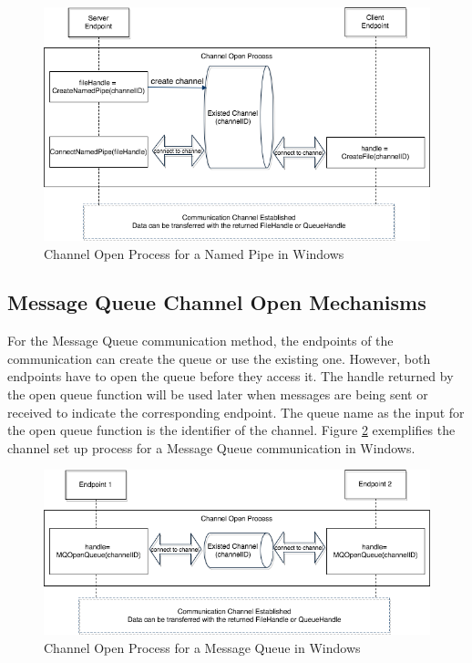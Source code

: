 \begin{figure}[H]
\centerline{\includegraphics[scale=0.5]{Figures/namepipechannelopen}}
 \caption{Channel Open Process for a Named Pipe in Windows}
\label{namedpipeopen}
\end{figure}
    
\subsection{Message Queue Channel Open Mechanisms} 
For the Message Queue communication method, the endpoints of the communication can create the queue or use the existing one. However, both endpoints have to open the queue before they access it. The handle returned by the open queue function will be used later when messages are being sent or received to indicate the corresponding endpoint. The queue name as the input for the open queue function is the identifier of the channel. \cite{WinMSMQ} Figure \ref{msmqopen} exemplifies the channel set up process for a Message Queue communication in Windows.

\begin{figure}[H]
\centerline{\includegraphics[scale=0.5]{Figures/msmqchannelopen}}
 \caption{Channel Open Process for a Message Queue in Windows}
\label{msmqopen}
\end{figure}

